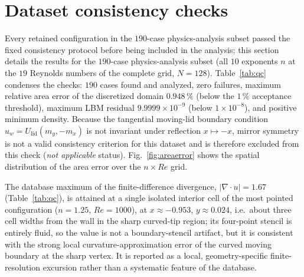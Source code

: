 \documentclass[11pt]{article}
\begin{document}

\section{Dataset consistency checks}\label{sec:database}
Every retained configuration in the $190$-case physics-analysis subset
passed the fixed consistency protocol before being included in the analysis;
this section details the results for
the $190$-case physics-analysis subset (all $10$ exponents $n$ at the $19$
Reynolds numbers of the complete grid, $N=128$). Table~\ref{tab:qc} condenses the
checks: $190$ cases found
and analyzed, zero failures, maximum relative area error of the discretized
domain $0.948\,\%$ (below the $1\,\%$ acceptance threshold), maximum LBM residual
$9.9999\times10^{-9}$ (below $1\times10^{-8}$), and positive minimum density.
Because the tangential moving-lid boundary condition
$u_w=U_{\mathrm{lid}}(m_y,-m_x)$ is not invariant under reflection
$x\mapsto-x$, mirror symmetry is not a valid consistency criterion for
this dataset and is therefore excluded from this check
(\emph{not applicable} status). Fig.~\ref{fig:areaerror} shows the spatial
distribution of the area error over the $n\times Re$ grid.

The database maximum of the finite-difference divergence, $|\nabla\cdot u|=1.67$
(Table~\ref{tab:qc}), is attained at a single isolated interior cell of the most
pointed configuration ($n=1.25$, $Re=1000$), at $x\approx-0.953$,
$y\approx0.024$, i.e.\ about three cell widths from the wall in the sharp
curved-tip region; its four-point stencil is entirely fluid, so the value is
not a boundary-stencil artifact, but it is consistent with the strong local
curvature-approximation error of the curved moving boundary at the sharp
vertex. It is reported as a local, geometry-specific finite-resolution
excursion rather than a systematic feature of the database.
\end{document}
